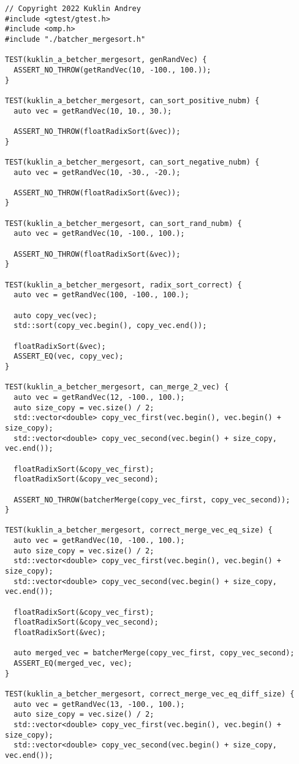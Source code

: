 \documentclass{report}
\begin{document}
\begin{lstlisting}
// Copyright 2022 Kuklin Andrey
#include <gtest/gtest.h>
#include <omp.h>
#include "./batcher_mergesort.h"

TEST(kuklin_a_betcher_mergesort, genRandVec) {
  ASSERT_NO_THROW(getRandVec(10, -100., 100.));
}

TEST(kuklin_a_betcher_mergesort, can_sort_positive_nubm) {
  auto vec = getRandVec(10, 10., 30.);

  ASSERT_NO_THROW(floatRadixSort(&vec));
}

TEST(kuklin_a_betcher_mergesort, can_sort_negative_nubm) {
  auto vec = getRandVec(10, -30., -20.);

  ASSERT_NO_THROW(floatRadixSort(&vec));
}

TEST(kuklin_a_betcher_mergesort, can_sort_rand_nubm) {
  auto vec = getRandVec(10, -100., 100.);

  ASSERT_NO_THROW(floatRadixSort(&vec));
}

TEST(kuklin_a_betcher_mergesort, radix_sort_correct) {
  auto vec = getRandVec(100, -100., 100.);

  auto copy_vec(vec);
  std::sort(copy_vec.begin(), copy_vec.end());

  floatRadixSort(&vec);
  ASSERT_EQ(vec, copy_vec);
}

TEST(kuklin_a_betcher_mergesort, can_merge_2_vec) {
  auto vec = getRandVec(12, -100., 100.);
  auto size_copy = vec.size() / 2;
  std::vector<double> copy_vec_first(vec.begin(), vec.begin() + size_copy);
  std::vector<double> copy_vec_second(vec.begin() + size_copy, vec.end());

  floatRadixSort(&copy_vec_first);
  floatRadixSort(&copy_vec_second);

  ASSERT_NO_THROW(batcherMerge(copy_vec_first, copy_vec_second));
}

TEST(kuklin_a_betcher_mergesort, correct_merge_vec_eq_size) {
  auto vec = getRandVec(10, -100., 100.);
  auto size_copy = vec.size() / 2;
  std::vector<double> copy_vec_first(vec.begin(), vec.begin() + size_copy);
  std::vector<double> copy_vec_second(vec.begin() + size_copy, vec.end());

  floatRadixSort(&copy_vec_first);
  floatRadixSort(&copy_vec_second);
  floatRadixSort(&vec);

  auto merged_vec = batcherMerge(copy_vec_first, copy_vec_second);
  ASSERT_EQ(merged_vec, vec);
}

TEST(kuklin_a_betcher_mergesort, correct_merge_vec_eq_diff_size) {
  auto vec = getRandVec(13, -100., 100.);
  auto size_copy = vec.size() / 2;
  std::vector<double> copy_vec_first(vec.begin(), vec.begin() + size_copy);
  std::vector<double> copy_vec_second(vec.begin() + size_copy, vec.end());


\end{lstlisting}
\end{document}
